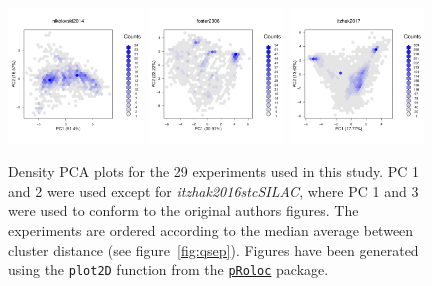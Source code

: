 \documentclass[12pt]{article}\usepackage[]{graphicx}\usepackage[]{color}
\newcommand{\Rpackage}[1]{\texttt{#1}}
\newcommand\Biocpkg[1]{%
  {\href{http://bioconductor.org/packages/#1}%
    {\Rpackage{#1}}}}
\begin{document}
\begin{appendices}
\begin{figure}[htb]
  \includegraphics[width = 0.32\textwidth]{./figure/fighexpca-26.pdf}
  \includegraphics[width = 0.32\textwidth]{./figure/fighexpca-27.pdf}
  \includegraphics[width = 0.32\textwidth]{./figure/fighexpca-28.pdf}
  \caption{Density PCA plots for the 29 experiments
    used in this study. PC 1 and 2 were used except for
    \textit{itzhak2016stcSILAC}, where PC 1 and 3 were used to conform
    to the original authors figures. The experiments are ordered
    according to the median average between cluster distance (see
    figure~\ref{fig:qsep}). Figures have been generated using the
    \texttt{plot2D} function from the \Biocpkg{pRoloc} package.}
  \label{fig:denspca}
\end{figure}



\end{appendices}
\end{document}
